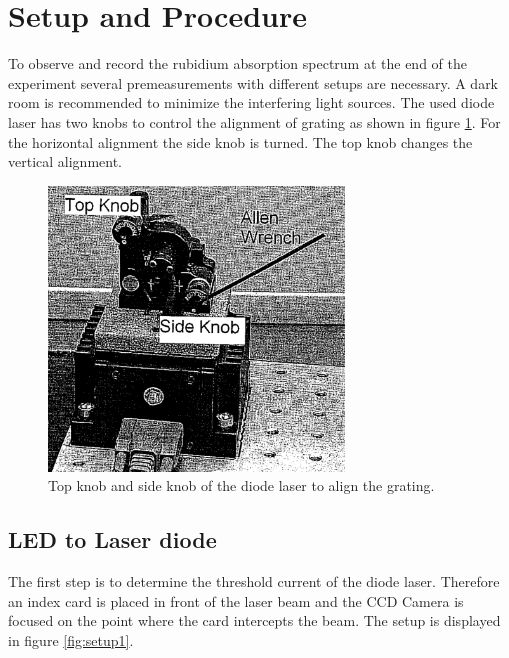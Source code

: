 \section{Setup and Procedure}
\label{sec:setup}
To observe and record the rubidium absorption spectrum at the end
of the experiment
several premeasurements with different setups are necessary.
A dark room is recommended to minimize the
interfering light sources.
The used diode laser has two knobs to control the alignment of grating
as shown in figure \ref{fig:knobs}.
For the horizontal alignment the side knob is turned. The
top knob changes the vertical alignment.
\begin{figure}
  \centering
  \includegraphics[width=0.7\textwidth]{Laserknobs.png}
  \caption{Top knob and side knob of the diode laser to align the grating.\cite{V61}}
  \label{fig:knobs}
\end{figure}


\subsection{LED to Laser diode}
\label{subsec:LED_Laser}

The first step is to determine the threshold current
of the diode laser.
Therefore an index card is placed in front of the laser beam and the CCD Camera
is focused on the point where the card intercepts the beam.
The setup is displayed
in figure \ref{fig:setup1}.

